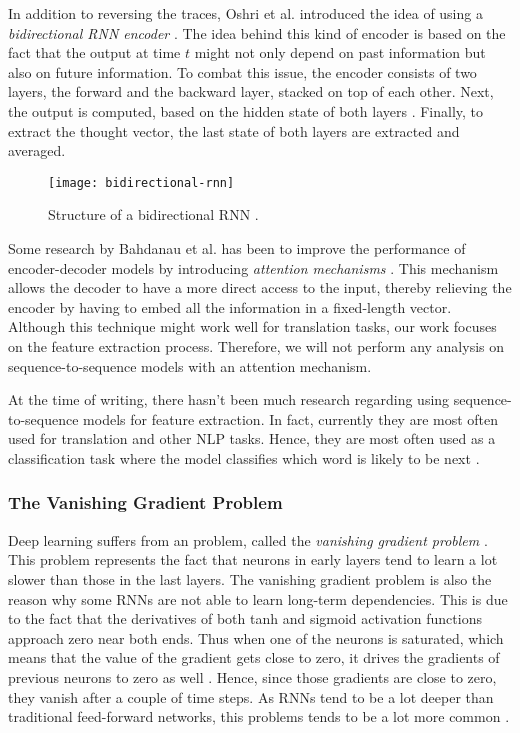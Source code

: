 In addition to reversing the traces, Oshri et al. introduced the idea of using a \textit{bidirectional RNN encoder} \cite{rnnencoder}.
The idea behind this kind of encoder is based on the fact that the output at time $t$ might not only depend on past information but also on future information.
To combat this issue, the encoder consists of two layers, the forward and the backward layer, stacked on top of each other.
Next, the output is computed, based on the hidden state of both layers \cite{britz_2016}.
Finally, to extract the thought vector, the last state of both layers are extracted and averaged.

\begin{figure}[ht]
  \centering
  \texttt{[image: bidirectional-rnn]}
  \caption{Structure of a bidirectional RNN \cite{britz_2016}.}
  \label{fig:bidirectional-rnn}
\end{figure}

\newpage

Some research by Bahdanau et al. has been to improve the performance of encoder-decoder models by introducing \textit{attention mechanisms} \cite{attention_mechanisms}.
This mechanism allows the decoder to have a more direct access to the input, thereby relieving the encoder by having to embed all the information in a fixed-length vector.
Although this technique might work well for translation tasks, our work focuses on the feature extraction process.
Therefore, we will not perform any analysis on sequence-to-sequence models with an attention mechanism.

At the time of writing, there hasn't been much research regarding using sequence-to-sequence models for feature extraction.
In fact, currently they are most often used for translation and other NLP tasks.
Hence, they are most often used as a classification task where the model classifies which word is likely to be next \cite{tensorflowseq2seq,cho2014learning,rnnencoder,sutskever_vinyals_le}.

\subsubsection{The Vanishing Gradient Problem}

Deep learning suffers from an problem, called the \textit{vanishing gradient problem} \cite{nielsen_2017}.
This problem represents the fact that neurons in early layers tend to learn a lot slower than those in the last layers.
The vanishing gradient problem is also the reason why some RNNs are not able to learn long-term dependencies.
This is due to the fact that the derivatives of both tanh and sigmoid activation functions approach zero near both ends.
Thus when one of the neurons is saturated, which means that the value of the gradient gets close to zero, it drives the gradients of previous neurons to zero as well \cite{britz_2016}.
Hence, since those gradients are close to zero, they vanish after a couple of time steps.
As RNNs tend to be a lot deeper than traditional feed-forward networks, this problems tends to be a lot more common \cite{britz_2016}.

